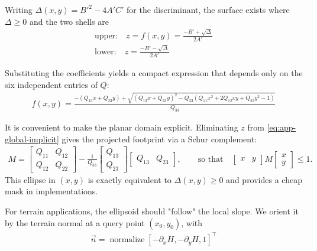 Writing $\Delta(x,y)=B'^2-4A'C'$ for the discriminant, the surface exists where $\Delta\ge 0$ and the two shells are
\begin{align}
    \label{eq:app-upper}
    \text{upper:}\quad z = f(x,y) = \frac{-B' + \sqrt{ \Delta }}{ 2A' } \\
    \label{eq:app-lower}
    \text{lower:}\quad z = \frac{-B' - \sqrt{\Delta}}{2A'}
\end{align}

Substituting the coefficients yields a compact expression that depends only on the six independent entries of $Q$:
\begin{align}
    \label{eq:app-upper-final}
    f(x,y)=
    \frac{
    -(Q_{13}x+Q_{23}y)
    +\sqrt{(Q_{13}x+Q_{23}y)^2 - Q_{33} \left(Q_{11}x^2 + 2Q_{12}xy + Q_{22}y^2 - 1\right)}
    }{Q_{33}}
\end{align}


It is convenient to make the planar domain explicit. Eliminating $z$ from \cref{eq:app-global-implicit} gives the projected footprint via a Schur complement:
\begin{align}
    M =
    \begin{bmatrix}
    Q_{11} & Q_{12}\\
    Q_{12} & Q_{22}
    \end{bmatrix}
    -
    \frac{1}{Q_{33}}
    \begin{bmatrix}
    Q_{13}\\ Q_{23}
    \end{bmatrix}
    \begin{bmatrix}
    Q_{13} & Q_{23}
    \end{bmatrix},
    \qquad
    \text{so that}\quad
    \begin{bmatrix}x & y\end{bmatrix} M \begin{bmatrix}x\\ y\end{bmatrix} \le 1.
\end{align}
This ellipse in $(x,y)$ is exactly equivalent to $\Delta(x,y)\ge 0$ and provides a cheap mask in implementations.

For terrain applications, the ellipsoid should "follow" the local slope. We orient it by the terrain normal at a query point $(x_0,y_0)$, with
\begin{align}
    \label{eq:app-terrain-normal}
    \vec n=\operatorname{normalize} [-\partial_x H, -\partial_y H, 1]^\top
\end{align}

